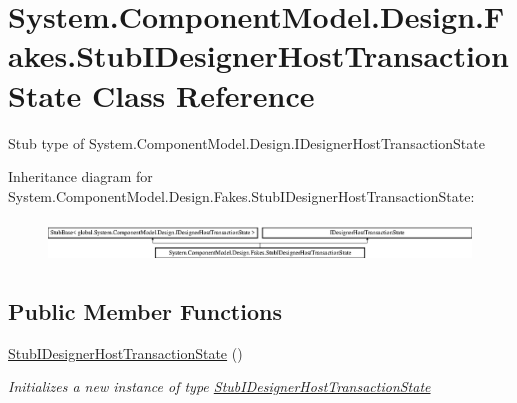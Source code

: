 \hypertarget{class_system_1_1_component_model_1_1_design_1_1_fakes_1_1_stub_i_designer_host_transaction_state}{\section{System.\-Component\-Model.\-Design.\-Fakes.\-Stub\-I\-Designer\-Host\-Transaction\-State Class Reference}
\label{class_system_1_1_component_model_1_1_design_1_1_fakes_1_1_stub_i_designer_host_transaction_state}
}


Stub type of System.\-Component\-Model.\-Design.\-I\-Designer\-Host\-Transaction\-State 


Inheritance diagram for System.\-Component\-Model.\-Design.\-Fakes.\-Stub\-I\-Designer\-Host\-Transaction\-State\-:\begin{figure}[H]
\begin{center}
\leavevmode
\includegraphics[height=1.126761cm]{class_system_1_1_component_model_1_1_design_1_1_fakes_1_1_stub_i_designer_host_transaction_state}
\end{center}
\end{figure}
\subsection*{Public Member Functions}
\begin{DoxyCompactItemize}
\item 
\hyperlink{class_system_1_1_component_model_1_1_design_1_1_fakes_1_1_stub_i_designer_host_transaction_state_a7cc8c985e26f2191bccd0b4541909982}{Stub\-I\-Designer\-Host\-Transaction\-State} ()
\begin{DoxyCompactList}\small\item\em Initializes a new instance of type \hyperlink{class_system_1_1_component_model_1_1_design_1_1_fakes_1_1_stub_i_designer_host_transaction_state}{Stub\-I\-Designer\-Host\-Transaction\-State}\end{DoxyCompactList}\end{DoxyCompactItemize}

